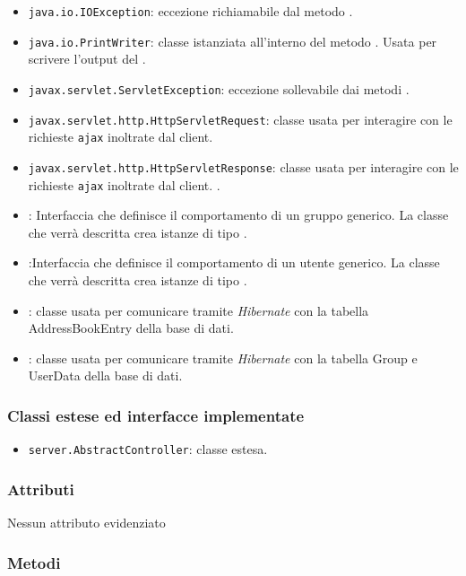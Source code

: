\begin{itemize}
	\item \texttt{java.io.IOException}: eccezione richiamabile dal metodo .
	\item \texttt{java.io.PrintWriter}: classe istanziata all'interno del metodo . Usata per scrivere l'output del .
	\item \texttt{javax.servlet.ServletException}: eccezione sollevabile dai metodi .
	\item \texttt{javax.servlet.http.HttpServletRequest}: classe usata per interagire con le richieste \texttt{ajax} inoltrate dal client.
	\item \texttt{javax.servlet.http.HttpServletResponse}: classe usata per interagire con le richieste \texttt{ajax} inoltrate dal client. .
	\item {}:
Interfaccia che definisce il comportamento di un gruppo generico. La classe che verrà descritta crea istanze di tipo .
	\item {}:Interfaccia che definisce il comportamento di un utente generico. La classe che verrà descritta crea istanze di tipo .
	\item {}: classe usata per comunicare tramite \textit{Hibernate} con la tabella AddressBookEntry della base di dati.
	\item {}: classe usata per comunicare tramite \textit{Hibernate} con la tabella Group e UserData della base di dati.
\end{itemize}

\subsubsection*{Classi estese ed interfacce implementate}
\begin{itemize}
	\item \texttt{server.AbstractController}: classe estesa.
\end{itemize}

\subsubsection*{Attributi}

Nessun attributo evidenziato


\subsubsection*{Metodi}

